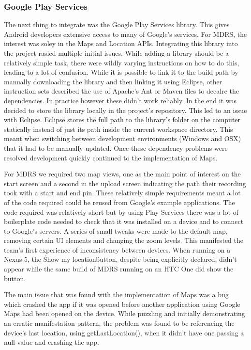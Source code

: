 \documentclass{l3proj}
\begin{document}
\subsubsection{Google Play Services}    The next thing to integrate was the
Google Play Services library. This gives Android developers extensive access to
many of Google's services. For MDRS, the interest was soley in the Maps and Location APIs. Integrating this library into the project rasied multiple initial
issues. While adding a library should be a relatively simple task, there were
wildly varying instructions on how to do this, leading to a lot of confusion.
While it is possible to link it to the build path by manually downloading the
library and then linking it using Eclipse, other instruction sets described the
use of Apache's Ant or Maven files to decalre the dependencies. In practice
however these didn't work reliably. In the end it was decided to store the
library locally in the project's repository. This led to an issue with Eclipse.
Eclipse stores the full path to the library's folder on the computer statically
instead of just its path inside the current workspace directory. This meant when
switching between development environments (Windows and OSX) that it had to be
manually updated. Once these dependency problems were resolved development
quickly continued to the implementation of Maps.

For MDRS we required two map views, one as the main point of interest on the start screen and a second in the upload screen indicating the path their recording took with a start and end pin. These relatively simple requirements meant a lot of the code required could be reused from Google's example applications. The code required was relatively short but by using Play Services there was a lot of boilerplate code needed to check that it was installed on a device and to connect to Google's servers. A series of small tweaks were made to the default map, removing certain UI elements and changing the zoom levels. This manifested the team's first experience of inconsistency between devices. When running on a Nexus 5, the \'Show my location\' button, despite being explicitly declared, didn't appear while the same build of MDRS running on an HTC One did show the button.

The main issue that was found with the implementation of Maps was a bug which crashed the app if it was opened before another application using Google Maps had been opened on the device. While puzzling and initially demonstrating an erratic manifestation pattern, the problem was found to be referencing the device's last location, using getLastLocation(), when it didn't have one passing a null value and crashing the app.
\end{document}

